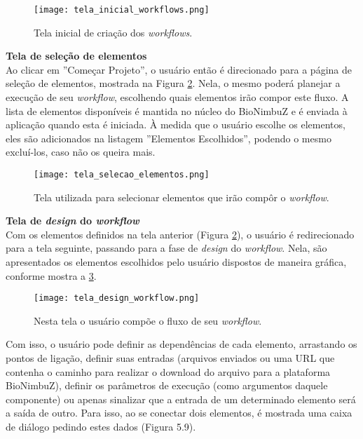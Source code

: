 \begin{figure}[H]
	\centering
	\texttt{[image: tela\_inicial\_workflows.png]}
	\caption{Tela inicial de criação dos \textit{workflows}.}
	\label{fig:tela_inicial_workflows}
\end{figure}

\noindent
\textbf{Tela de seleção de elementos} \\

\noindent
Ao clicar em ''Começar Projeto'', o usuário então é direcionado para a página de seleção de elementos, mostrada na Figura \ref{fig:tela_selecao_elementos}. Nela, o mesmo poderá planejar a execução de seu \textit{workflow}, escolhendo quais elementos irão compor este fluxo. A lista de elementos disponíveis é mantida no núcleo do BioNimbuZ e é enviada à aplicação quando esta é iniciada. À medida que o usuário escolhe os elementos, eles são adicionados na listagem ''Elementos Escolhidos'', podendo o mesmo excluí-los, caso não os queira mais.

\begin{figure}[H]
	\centering
	\texttt{[image: tela\_selecao\_elementos.png]}
	\caption{Tela utilizada para selecionar elementos que irão compôr o \textit{workflow}.}
	\label{fig:tela_selecao_elementos}
\end{figure}

\noindent
\textbf{Tela de \textit{design} do \textit{workflow}} \\

\noindent
Com os elementos definidos na tela anterior (Figura \ref{fig:tela_selecao_elementos}), o usuário é redirecionado para a tela seguinte, passando para a fase de \textit{design} do \textit{workflow}. Nela, são apresentados os elementos escolhidos pelo usuário dispostos de maneira gráfica, conforme mostra a \ref{fig:tela_design_workflow}.

\begin{figure}[H]
	\centering
	\texttt{[image: tela\_design\_workflow.png]}
	\caption{Nesta tela o usuário compõe o fluxo de seu \textit{workflow}.}
	\label{fig:tela_design_workflow}
\end{figure}

Com isso, o usuário pode definir as dependências de cada elemento, arrastando os pontos de ligação, definir suas entradas (arquivos enviados ou uma URL que contenha o caminho para realizar o download do arquivo para a plataforma BioNimbuZ), definir os parâmetros de execução (como argumentos daquele componente) ou apenas sinalizar que a entrada de um determinado elemento será a saída de outro. Para isso, ao se conectar dois elementos, é mostrada uma caixa de diálogo pedindo estes dados (Figura 5.9).

